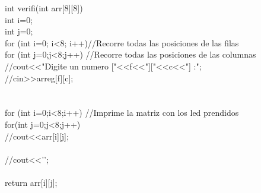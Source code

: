 \documentclass{article}
\begin{document}
int verifi(int arr[8][8]){\\

    int i=0;\\
    int j=0;\\
    for (int i=0; i<8; i++){//Recorre todas las posiciones de las filas\\
        for (int j=0;j<8;j++){  //Recorre todas las posiciones de las columnas\\
            	//cout<<"Digite un numero ["<<f<<"]["<<c<<"] :";\\
            	//cin>>arreg[f][c];\\
            }\\
        }\\
    for (int i=0;i<8;i++){ //Imprime la matriz con los led prendidos\\
        for(int j=0;j<8;j++){\\
            //cout<<arr[i][j];\\
        }\\
        //cout<<'\n';\\
    }\\
    return arr[i][j];\\
}\\
\end{document}
